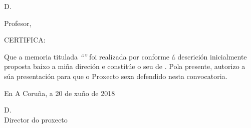 %
%
\thispagestyle{plain}
\begin{center}
	\begin{minipage}[t][6cm][l]{.8\textwidth}
		\begin{center}
			D. {\sc \director}

			Profesor, \centro

			\departamento
			
			\universidad
		\end{center}
	\end{minipage}
\end{center}

CERTIFICA:

Que a memoria titulada {\it ``\titulogalego''} foi realizada por {\sc \autor}
conforme á descrición inicialmente proposta baixo a miña direción e
constitúe o seu {\proyecto} de {\curso}.
Pola presente, autorizo a súa presentación para que o Proxecto sexa defendido
nesta convocatoria.

\vspace{3cm}

En A Coruña, a 20 de xuño de 2018

\vspace{3cm}
\begin{center}
	\begin{minipage}[t][4cm][l]{.5\textwidth}
	D. {\sc \director}
	\\
	Director do proxecto
	\end{minipage}
\end{center}
